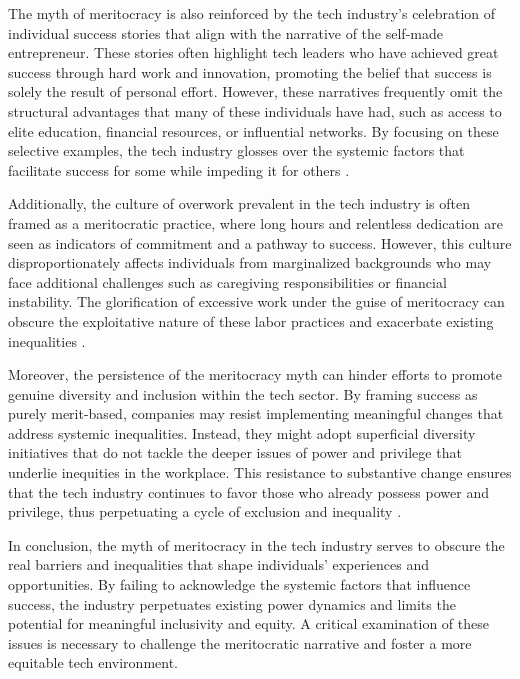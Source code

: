 The myth of meritocracy is also reinforced by the tech industry's celebration of individual success stories that align with the narrative of the self-made entrepreneur. These stories often highlight tech leaders who have achieved great success through hard work and innovation, promoting the belief that success is solely the result of personal effort. However, these narratives frequently omit the structural advantages that many of these individuals have had, such as access to elite education, financial resources, or influential networks. By focusing on these selective examples, the tech industry glosses over the systemic factors that facilitate success for some while impeding it for others \cite[pp.~12-14]{saxenian1999regional}.

Additionally, the culture of overwork prevalent in the tech industry is often framed as a meritocratic practice, where long hours and relentless dedication are seen as indicators of commitment and a pathway to success. However, this culture disproportionately affects individuals from marginalized backgrounds who may face additional challenges such as caregiving responsibilities or financial instability. The glorification of excessive work under the guise of meritocracy can obscure the exploitative nature of these labor practices and exacerbate existing inequalities \cite[pp.~205-207]{wajcman2010feminist}.

Moreover, the persistence of the meritocracy myth can hinder efforts to promote genuine diversity and inclusion within the tech sector. By framing success as purely merit-based, companies may resist implementing meaningful changes that address systemic inequalities. Instead, they might adopt superficial diversity initiatives that do not tackle the deeper issues of power and privilege that underlie inequities in the workplace. This resistance to substantive change ensures that the tech industry continues to favor those who already possess power and privilege, thus perpetuating a cycle of exclusion and inequality \cite[pp.~32-35]{kalev2006best}.

In conclusion, the myth of meritocracy in the tech industry serves to obscure the real barriers and inequalities that shape individuals' experiences and opportunities. By failing to acknowledge the systemic factors that influence success, the industry perpetuates existing power dynamics and limits the potential for meaningful inclusivity and equity. A critical examination of these issues is necessary to challenge the meritocratic narrative and foster a more equitable tech environment.

